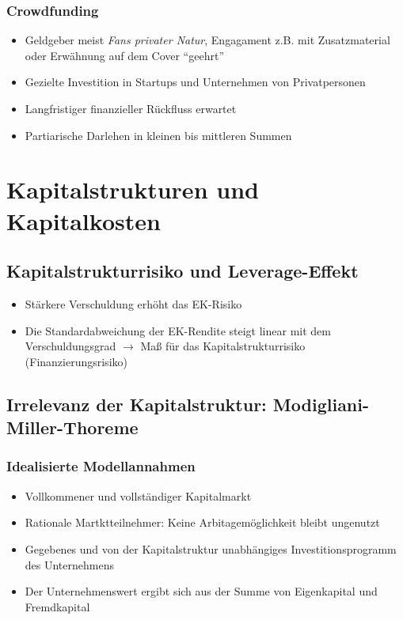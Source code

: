 \subsubsection{Crowdfunding}
\begin{itemize}
	\item Geldgeber meist \textit{Fans privater Natur}, Engagament z.B. mit Zusatzmaterial oder Erwähnung auf dem Cover "`geehrt"'
	\item Gezielte Investition in Startups und Unternehmen von Privatpersonen
	\item Langfristiger finanzieller Rückfluss erwartet
	\item Partiarische Darlehen in kleinen bis mittleren Summen
\end{itemize}



\section{Kapitalstrukturen und Kapitalkosten}

\subsection{Kapitalstrukturrisiko und Leverage-Effekt}
\begin{itemize}
	\item Stärkere Verschuldung erhöht das EK-Risiko
	\item Die Standardabweichung der EK-Rendite steigt linear mit dem Verschuldungsgrad $\rightarrow$ Maß für das Kapitalstrukturrisiko (Finanzierungsrisiko)
\end{itemize}


\subsection{Irrelevanz der Kapitalstruktur: Modigliani-Miller-Thoreme}

\subsubsection{Idealisierte Modellannahmen}
\begin{itemize}
	\item Vollkommener und vollständiger Kapitalmarkt
	\item Rationale Martktteilnehmer: Keine Arbitagemöglichkeit bleibt ungenutzt
	\item Gegebenes und von der Kapitalstruktur unabhängiges Investitionsprogramm des Unternehmens
	\item Der Unternehmenswert ergibt sich aus der Summe von Eigenkapital und Fremdkapital
\end{itemize}

